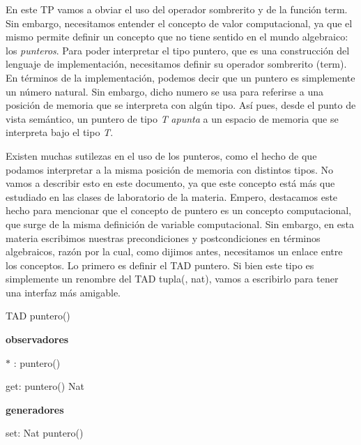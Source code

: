 \-En este \-T\-P vamos a obviar el uso del operador sombrerito y de la función term. \-Sin embargo, necesitamos entender el concepto de valor computacional, ya que el mismo permite definir un concepto que no tiene sentido en el mundo algebraico\-: los {\itshape punteros\/}. \-Para poder interpretar el tipo puntero, que es una construcción del lenguaje de implementación, necesitamos definir su operador sombrerito (term). \-En términos de la implementación, podemos decir que un puntero es simplemente un número natural. \-Sin embargo, dicho numero se usa para referirse a una posición de memoria que se interpreta con algún tipo. \-Así pues, desde el punto de vista semántico, un puntero de tipo {\itshape \-T\/} {\itshape apunta\/} a un espacio de memoria que se interpreta bajo el tipo {\itshape \-T\/}.

\-Existen muchas sutilezas en el uso de los punteros, como el hecho de que podamos interpretar a la misma posición de memoria con distintos tipos. \-No vamos a describir esto en este documento, ya que este concepto está más que estudiado en las clases de laboratorio de la materia. \-Empero, destacamos este hecho para mencionar que el concepto de puntero es un concepto computacional, que surge de la misma definición de variable computacional. \-Sin embargo, en esta materia escribimos nuestras precondiciones y postcondiciones en términos algebraicos, razón por la cual, como dijimos antes, necesitamos un enlace entre los conceptos. \-Lo primero es definir el \-T\-A\-D puntero. \-Si bien este tipo es simplemente un renombre del \-T\-A\-D tupla(, nat), vamos a escribirlo para tener una interfaz más amigable.

\-T\-A\-D puntero()\par
 {\bfseries observadores} \par

\begin{DoxyItemize}
\item $\ast$ \-: puntero()  \par

\item get\-: puntero()  \-Nat
\end{DoxyItemize}

{\bfseries generadores} \par

\begin{DoxyItemize}
\item set\-: \-Nat    puntero()
\end{DoxyItemize}

